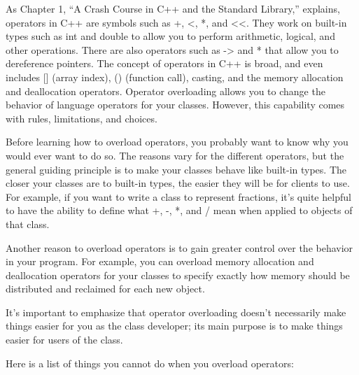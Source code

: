 
As Chapter 1, “A Crash Course in C++ and the Standard Library,” explains, operators in C++ are symbols such as +, <, *, and <{}<. They work on built-in types such as int and double to allow you to perform arithmetic, logical, and other operations. There are also operators such as -> and * that allow you to dereference pointers. The concept of operators in C++ is broad, and even includes [] (array index), () (function call), casting, and the memory allocation and deallocation operators. Operator overloading allows you to change the behavior of language operators for your classes. However, this capability comes with rules, limitations, and choices.


Before learning how to overload operators, you probably want to know why you would ever want to do so. The reasons vary for the different operators, but the general guiding principle is to make your classes behave like built-in types. The closer your classes are to built-in types, the easier they will be for clients to use. For example, if you want to write a class to represent fractions, it’s quite helpful to have the ability to define what +, -, *, and / mean when applied to objects of that class.

Another reason to overload operators is to gain greater control over the behavior in your program. For example, you can overload memory allocation and deallocation operators for your classes to specify exactly how memory should be distributed and reclaimed for each new object.

It’s important to emphasize that operator overloading doesn’t necessarily make things easier for you as the class developer; its main purpose is to make things easier for users of the class.


Here is a list of things you cannot do when you overload operators:

